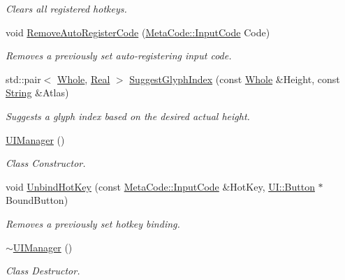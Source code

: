 \begin{DoxyCompactItemize}
\begin{DoxyCompactList}\small\item\em Clears all registered hotkeys. \item\end{DoxyCompactList}\item 
void \hyperlink{classMezzanine_1_1UIManager_a38a2c2037d0f73c2ddae51b62b171815}{RemoveAutoRegisterCode} (\hyperlink{classMezzanine_1_1MetaCode_a3b5633f0145bf3287cf53a3f05b5563c}{MetaCode::InputCode} Code)
\begin{DoxyCompactList}\small\item\em Removes a previously set auto-\/registering input code. \item\end{DoxyCompactList}\item 
std::pair$<$ \hyperlink{namespaceMezzanine_adcbb6ce6d1eb4379d109e51171e2e493}{Whole}, \hyperlink{namespaceMezzanine_a726731b1a7df72bf3583e4a97282c6f6}{Real} $>$ \hyperlink{classMezzanine_1_1UIManager_aaf4698cd4bac16736c81134aa977a0f9}{SuggestGlyphIndex} (const \hyperlink{namespaceMezzanine_adcbb6ce6d1eb4379d109e51171e2e493}{Whole} \&Height, const \hyperlink{namespaceMezzanine_acf9fcc130e6ebf08e3d8491aebcf1c86}{String} \&Atlas)
\begin{DoxyCompactList}\small\item\em Suggests a glyph index based on the desired actual height. \item\end{DoxyCompactList}\item 
\hyperlink{classMezzanine_1_1UIManager_a2101862a8b3f08f2fa657b0bffb75bd0}{UIManager} ()
\begin{DoxyCompactList}\small\item\em Class Constructor. \item\end{DoxyCompactList}\item 
void \hyperlink{classMezzanine_1_1UIManager_aad7572eab280b81844c011cc28ca1be3}{UnbindHotKey} (const \hyperlink{classMezzanine_1_1MetaCode_a3b5633f0145bf3287cf53a3f05b5563c}{MetaCode::InputCode} \&HotKey, \hyperlink{classMezzanine_1_1UI_1_1Button}{UI::Button} $\ast$BoundButton)
\begin{DoxyCompactList}\small\item\em Removes a previously set hotkey binding. \item\end{DoxyCompactList}\item 
\hyperlink{classMezzanine_1_1UIManager_ad480071e4f02d2e24903da56425e6b6a}{$\sim$UIManager} ()
\begin{DoxyCompactList}\small\item\em Class Destructor. \item\end{DoxyCompactList}\end{DoxyCompactItemize}
